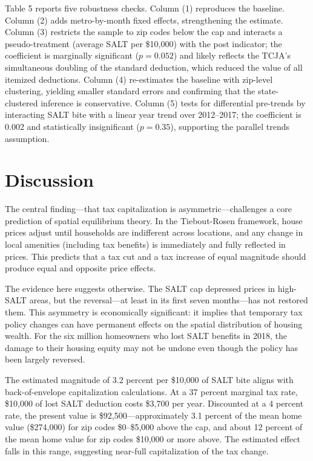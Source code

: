 \documentclass[12pt]{article}
\begin{document}
Table 5 reports five robustness checks. Column (1) reproduces the baseline. Column (2) adds metro-by-month fixed effects, strengthening the estimate. Column (3) restricts the sample to zip codes below the cap and interacts a pseudo-treatment (average SALT per \$10,000) with the post indicator; the coefficient is marginally significant ($p = 0.052$) and likely reflects the TCJA's simultaneous doubling of the standard deduction, which reduced the value of all itemized deductions. Column (4) re-estimates the baseline with zip-level clustering, yielding smaller standard errors and confirming that the state-clustered inference is conservative. Column (5) tests for differential pre-trends by interacting SALT bite with a linear year trend over 2012--2017; the coefficient is 0.002 and statistically insignificant ($p = 0.35$), supporting the parallel trends assumption.

\section{Discussion}

The central finding---that tax capitalization is asymmetric---challenges a core prediction of spatial equilibrium theory. In the Tiebout-Rosen framework, house prices adjust until households are indifferent across locations, and any change in local amenities (including tax benefits) is immediately and fully reflected in prices. This predicts that a tax cut and a tax increase of equal magnitude should produce equal and opposite price effects.

The evidence here suggests otherwise. The SALT cap depressed prices in high-SALT areas, but the reversal---at least in its first seven months---has not restored them. This asymmetry is economically significant: it implies that temporary tax policy changes can have permanent effects on the spatial distribution of housing wealth. For the six million homeowners who lost SALT benefits in 2018, the damage to their housing equity may not be undone even though the policy has been largely reversed.

The estimated magnitude of 3.2 percent per \$10,000 of SALT bite aligns with back-of-envelope capitalization calculations. At a 37 percent marginal tax rate, \$10,000 of lost SALT deduction costs \$3,700 per year. Discounted at a 4 percent rate, the present value is \$92,500---approximately 3.1 percent of the mean home value (\$274,000) for zip codes \$0--\$5,000 above the cap, and about 12 percent of the mean home value for zip codes \$10,000 or more above. The estimated effect falls in this range, suggesting near-full capitalization of the tax change.
\end{document}
